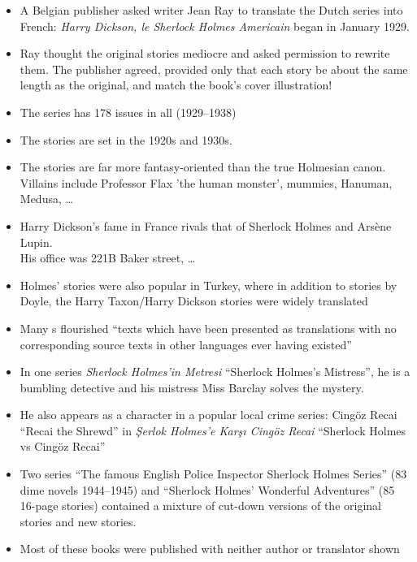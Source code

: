 \documentclass[a4paper,landscape,headrule,footrule,xetex]{foils}
\begin{document}

\begin{itemize}
\item A Belgian publisher asked writer Jean Ray to translate the Dutch
  series into French: \textit{Harry Dickson, le Sherlock
  Holmes Americain} began in January 1929.
\item Ray thought the original stories mediocre and asked permission
  to rewrite them.  The publisher agreed, provided only that each
  story be about the same length as the original, and match the book's
  cover illustration!
\item The series has 178 issues in all (1929--1938)
\item The stories are set in the 1920s and 1930s.
\item The stories are far more fantasy-oriented than the true
  Holmesian canon.  Villains include Professor Flax 'the human
  monster', mummies, Hanuman, Medusa, \ldots
\item Harry Dickson's fame in France rivals that of Sherlock Holmes
  and Arsène Lupin.
\\ His office was 221B Baker street, \ldots
\end{itemize}



\begin{itemize}\addtolength{\itemsep}{-1ex}
\item Holmes' stories were also popular in Turkey, where in addition
  to stories by Doyle, the Harry Taxon/Harry Dickson stories were
  widely translated
\item Many s flourished ``texts which have
  been presented as translations with no corresponding source texts in
  other languages ever having existed''
\item In one series \textit{Sherlock Holmes'in Metresi} ``Sherlock
  Holmes's Mistress'', he is a bumbling detective and his mistress Miss
  Barclay solves the mystery.
\item He also appears as a character in a popular local crime series: Cingöz Recai ``Recai the Shrewd'' in \textit{Şerlok Holmes'e Karşı Cingöz Recai} ``Sherlock Holmes vs Cingöz Recai''
\item Two series ``The famous English Police Inspector Sherlock Holmes
  Series'' (83 dime novels 1944--1945) and ``Sherlock Holmes'
  Wonderful Adventures'' (85 16-page stories) contained a mixture of
  cut-down versions of the original stories and new stories.
\item Most of these books were published with neither author or
  translator shown
\end{itemize}
\end{document}

